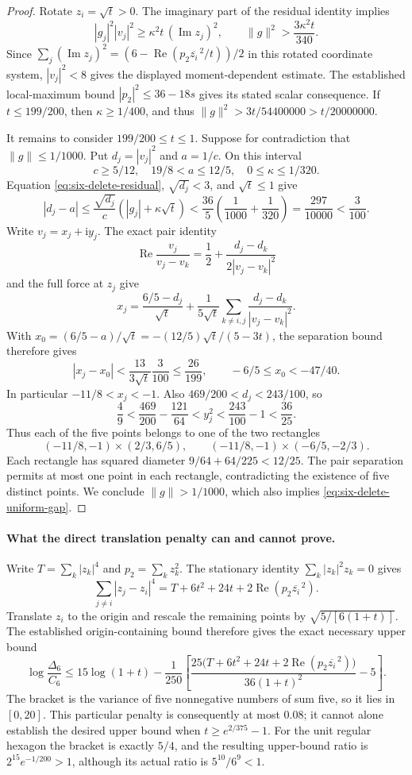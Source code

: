 \documentclass[11pt]{article}
\theoremstyle{remark}
\numberwithin{equation}{section}
\begin{document}
\begin{proof}
Rotate $z_i=\sqrt t>0$. The imaginary part of the residual
identity implies
\[
 |g_j|^2|v_j|^2\ge\kappa^2t\,(\operatorname{Im}z_j)^2,
 \qquad
 \|g\|^2>\frac{3\kappa^2t}{340}.
\]
Since $\sum_j(\operatorname{Im}z_j)^2
=(6-\operatorname{Re}(p_2\overline{z_i}^{\,2}/t))/2$
in this rotated coordinate system, $|v_j|^2<8$ gives the displayed
moment-dependent estimate. The established local-maximum bound
$|p_2|^2\le36-18s$ gives its stated scalar consequence.
If $t\le199/200$, then $\kappa\ge1/400$, and thus
$\|g\|^2>3t/54400000>t/20000000$.

It remains to consider $199/200\le t\le1$.
Suppose for contradiction that $\|g\|\le1/1000$.
Put $d_j=|v_j|^2$ and $a=1/c$. On this interval
\[
 c\ge5/12,\quad 19/8<a\le12/5,
 \quad 0\le\kappa\le1/320.
\]
Equation \eqref{eq:six-delete-residual}, $\sqrt{d_j}<3$,
and $\sqrt t\le1$ give
\[
 |d_j-a|\le\frac{\sqrt{d_j}}c
                (|g_j|+\kappa\sqrt t)
 <\frac{36}5\left(\frac1{1000}+\frac1{320}\right)
 =\frac{297}{10000}<\frac3{100}.
\]
Write $v_j=x_j+\mathrm i y_j$. The exact pair identity
\[
 \operatorname{Re}\frac{v_j}{v_j-v_k}
       =\frac12+\frac{d_j-d_k}{2|v_j-v_k|^2}
\]
and the full force at $z_j$ give
\[
 x_j=\frac{6/5-d_j}{\sqrt t}
       +\frac1{5\sqrt t}\sum_{k\ne i,j}
                                  \frac{d_j-d_k}{|v_j-v_k|^2}.
\]
With
$x_0=(6/5-a)/\sqrt t=-(12/5)\sqrt t/(5-3t)$,
the separation bound therefore gives
\[
 |x_j-x_0|<\frac{13}{3\sqrt t}\frac3{100}
              \le\frac{26}{199},\qquad
 -6/5\le x_0<-47/40.
\]
In particular $-11/8<x_j<-1$. Also
$469/200<d_j<243/100$, so
\[
 \frac49<\frac{469}{200}-\frac{121}{64}
        <y_j^2<\frac{243}{100}-1<\frac{36}{25}.
\]
Thus each of the five points belongs to one of the two rectangles
\[
 (-11/8,-1)\times(2/3,6/5),\qquad
 (-11/8,-1)\times(-6/5,-2/3).
\]
Each rectangle has squared diameter
$9/64+64/225<12/25$. The pair separation permits at most
one point in each rectangle, contradicting the existence of five
distinct points. We conclude $\|g\|>1/1000$, which also
implies \eqref{eq:six-delete-uniform-gap}.
\end{proof}

\paragraph{What the direct translation penalty can and cannot prove.}
Write $T=\sum_k|z_k|^4$ and $p_2=\sum_k z_k^2$.
The stationary identity $\sum_k|z_k|^2z_k=0$ gives
\[
 \sum_{j\ne i}|z_j-z_i|^4
       =T+6t^2+24t+2\operatorname{Re}(p_2\overline{z_i}^{\,2}).
\]
Translate $z_i$ to the origin and rescale the remaining points by
$\sqrt{5/[6(1+t)]}$. The established origin-containing bound
therefore gives the exact necessary upper bound
\[
 \log\frac{\Delta_6}{C_6}
 \le15\log(1+t)-\frac1{250}
 \left[
 \frac{25\bigl(T+6t^2+24t+
       2\operatorname{Re}(p_2\overline{z_i}^{\,2})\bigr)}
      {36(1+t)^2}-5\right].
\]
The bracket is the variance of five nonnegative numbers of sum five,
so it lies in $[0,20]$. This particular penalty is consequently at
most $0.08$; it cannot alone establish the desired upper bound
when $t\ge e^{2/375}-1$.
For the unit regular hexagon the bracket is exactly $5/4$, and
the resulting upper-bound ratio is $2^{15}e^{-1/200}>1$,
although its actual ratio is $5^{10}/6^9<1$.
\end{document}
